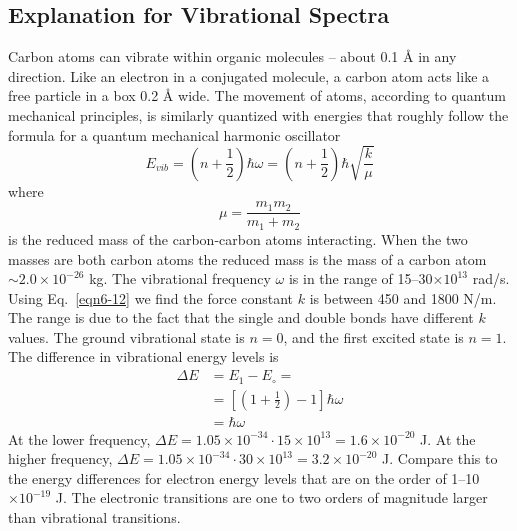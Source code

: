\subsection{Explanation for Vibrational Spectra}

Carbon atoms can vibrate within organic molecules -- about 0.1 $\text{\AA}$ in any direction.  Like an electron in a conjugated molecule, a carbon atom acts like a free particle in a box 0.2 $\text{\AA}$ wide.  The movement of atoms, according to quantum mechanical principles, is similarly quantized with energies that roughly follow the formula for a quantum mechanical harmonic oscillator
\begin{equation}\label{eqn6-12}
E_{vib} = \left(n+\frac{1}{2}\right)\hbar\omega = \left(n+\frac{1}{2}\right)\hbar\sqrt{\frac{k}{\mu}}
\end{equation}
where $$\mu=\frac{m_1m_2}{m_1+m_2}$$ is the reduced mass of the carbon-carbon atoms interacting. When the two masses are both carbon atoms the reduced mass is the mass of a carbon atom $\sim 2.0\times10^{-26}$ kg. The vibrational frequency $\omega$ is in the range of 15--30$\times10^{13}$ rad/s. Using Eq.~\ref{eqn6-12} we find the force constant $k$ is between 450 and 1800 N/m. The range is due to the fact that the single and double bonds have different $k$ values. The ground vibrational state is $n=0$, and the first excited state is $n=1$. The difference in vibrational energy levels is
\begin{align}
\Delta E &= E_1-E_{\circ}=\nonumber\\
		 &= \left[\left(1+\frac{1}{2}\right)-1\right]\hbar\omega\nonumber\\
		 &= \hbar\omega\nonumber
\end{align}
At the lower frequency, $\Delta E = 1.05\times10^{-34}\cdot 15\times10^{13} = 1.6\times10^{-20}$ J. At the higher frequency, $\Delta E = 1.05\times10^{-34}\cdot 30\times10^{13} = 3.2\times10^{-20}$ J. Compare this to the energy differences for electron energy levels that are on the order of 1--10$\times10^{-19}$ J. The electronic transitions are one to two orders of magnitude larger than vibrational transitions.

